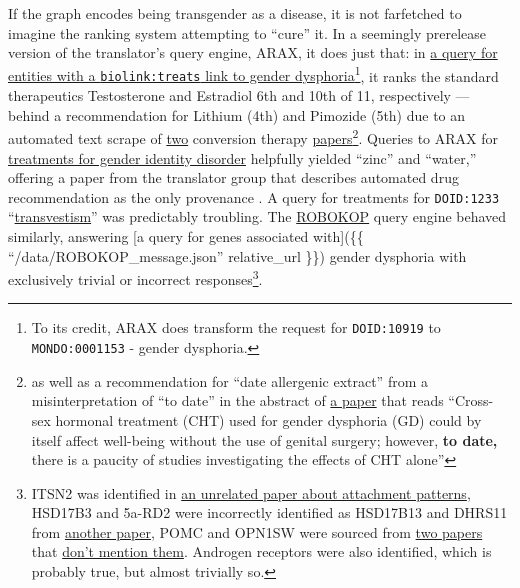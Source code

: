If the graph encodes being transgender as a disease, it is not
farfetched to imagine the ranking system attempting to ``cure'' it. In a
seemingly prerelease version of the translator's query engine, ARAX, it
does just that: in
\href{https://web.archive.org/web/20220828011010/https://arax.rtx.ai/?r=e891e6e6-44fd-4684-9d36-f94e3e81b554}{a
query for entities with a \texttt{biolink:treats} link to gender
dysphoria}\footnote{To its credit, ARAX does transform the request for
  \texttt{DOID:10919} to \texttt{MONDO:0001153} - gender dysphoria.}, it
ranks the standard therapeutics \cite{deutschOverviewFeminizingHormone2016, deutschOverviewMasculinizingHormone2016}  Testosterone and Estradiol
6th and 10th of 11, respectively --- behind a recommendation for Lithium
(4th) and Pimozide (5th) due to an automated text scrape of
\href{https://pubmed.ncbi.nlm.nih.gov/2114800/}{two} conversion therapy
\href{https://pubmed.ncbi.nlm.nih.gov/8839957/}{papers}\footnote{as well
  as a recommendation for ``date allergenic extract'' from a
  misinterpretation of ``to date'' in the abstract of
  \href{https://pubmed.ncbi.nlm.nih.gov/24330520/}{a paper} that reads
  ``Cross-sex hormonal treatment (CHT) used for gender dysphoria (GD)
  could by itself affect well-being without the use of genital surgery;
  however, \textbf{to date,} there is a paucity of studies investigating
  the effects of CHT alone''}. Queries to ARAX for
\href{https://web.archive.org/web/20220828011112/https://arax.ncats.io/?r=52703}{treatments
for gender identity disorder} helpfully yielded ``zinc'' and ``water,''
offering a paper from the translator group that describes automated drug
recommendation as the only provenance \cite{womackLeveragingDistributedBiomedical2019} . A query for treatments
for \texttt{DOID:1233}
``\href{https://web.archive.org/web/20221207013845/https://arax.rtx.ai/?r=81249a42-b300-4dcf-94c9-7a9fe2f78237}{transvestism}''
was predictably troubling. The
\href{https://robokop.renci.org/answer}{ROBOKOP} \cite{bizonROBOKOPKGKGB2019}  query engine behaved similarly, answering
{[}a query for genes associated with{]}(\{\{
``/data/ROBOKOP\_message.json'' \textbar{} relative\_url \}\}) gender
dysphoria with exclusively trivial or incorrect responses\footnote{ITSN2
  was identified in \href{https://pubmed.ncbi.nlm.nih.gov/28210932/}{an
  unrelated paper about attachment patterns}, HSD17B3 and 5a-RD2 were
  incorrectly identified as HSD17B13 and DHRS11 from
  \href{https://www.nature.com/articles/nrurol.2012.182}{another paper},
  POMC and OPN1SW were sourced from
  \href{https://www.frontiersin.org/articles/10.3389/fendo.2019.00751/full}{two
  papers} that \href{https://pubmed.ncbi.nlm.nih.gov/30843609/}{don't
  mention them}. Androgen receptors were also identified, which is
  probably true, but almost trivially so.}.


